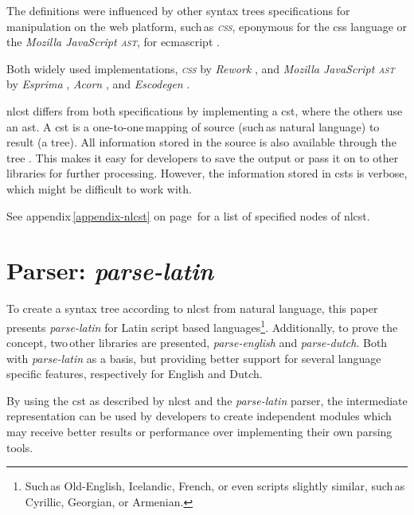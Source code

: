 The definitions were influenced by other syntax trees specifications for
  manipulation on the web platform, such\,as \emph{\textsc{css}}, eponymous
  for the \acrshort{css} language \autocite{reworkcss/css-source-code} or the
  \emph{Mozilla JavaScript \textsc{ast}}, for \gls{ecmascript}
  \autocite{mozilla.org-spidermonkey-parser_api}.

Both widely used implementations, \emph{\textsc{css}} by \emph{Rework}
  \autocite{reworkcss/rework-source-code}, and \emph{Mozilla JavaScript
  \textsc{ast}} by \emph{Esprima} \autocite{ariya/esprima-source-code},
  \emph{Acorn} \autocite{marijnh/acorn-source-code}, and \emph{Escodegen}
  \autocite{constellation/escodegen-source-code}.

\gls{nlcst} differs from both specifications by implementing a \gls{cst},
  where the others use an \gls{ast}.
A \gls{cst} is a one-to-one\,mapping of source (such\,as natural language)
  to result (a tree).
All information stored in the source is also available through the tree
  \autocite{thegreenplace.net-abstract-concrete-syntax-trees}.
This makes it easy for developers to save the output or pass it on to other
  libraries for further processing.
However, the information stored in \glspl{cst} is verbose, which might be
  difficult to work with.

\medskip\noindent See appendix\,\ref{appendix-nlcst} on
  page\,\pageref{appendix-nlcst} for a list of specified nodes of \gls{nlcst}.

\section{Parser: \emph{parse-latin}}\label{parser-parse-latin}

To create a syntax tree according to \gls{nlcst} from natural language,
  this paper presents \emph{parse-latin} for Latin script based
  languages\footnote{Such\,as Old-English, Icelandic, French, or even scripts
    slightly similar, such\,as Cyrillic, Georgian, or Armenian.}.
Additionally, to prove the concept, two\,other libraries are presented,
  \emph{parse-english} and \emph{parse-dutch}.
Both with \emph{parse-latin} as a basis, but providing better support for
  several language specific features, respectively for English and Dutch.

By using the \gls{cst} as described by \gls{nlcst} and the \emph{parse-latin}
  parser, the intermediate representation can be used by developers to
  create independent modules which may receive better results or
  performance over implementing their own parsing tools.

